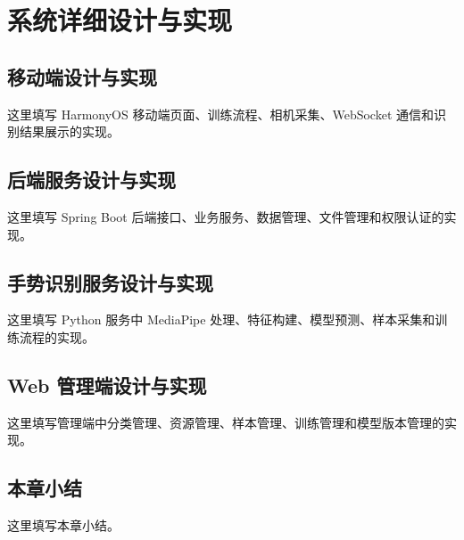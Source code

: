 ﻿%
\chapter{系统详细设计与实现}

\section{移动端设计与实现}

这里填写 HarmonyOS 移动端页面、训练流程、相机采集、WebSocket 通信和识别结果展示的实现。

\section{后端服务设计与实现}

这里填写 Spring Boot 后端接口、业务服务、数据管理、文件管理和权限认证的实现。

\section{手势识别服务设计与实现}

这里填写 Python 服务中 MediaPipe 处理、特征构建、模型预测、样本采集和训练流程的实现。

\section{Web 管理端设计与实现}

这里填写管理端中分类管理、资源管理、样本管理、训练管理和模型版本管理的实现。

\section{本章小结}

这里填写本章小结。

